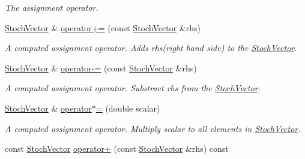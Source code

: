\begin{CompactItemize}
\begin{CompactList}\small\item\em The assignment operator. \item\end{CompactList}\item 
\hypertarget{class_stoch_vector_8a139128cf42525733cf6550758bd3c1}{
\hyperlink{class_stoch_vector}{StochVector} \& \hyperlink{class_stoch_vector_8a139128cf42525733cf6550758bd3c1}{operator+=} (const \hyperlink{class_stoch_vector}{StochVector} \&rhs)}
\label{class_stoch_vector_8a139128cf42525733cf6550758bd3c1}

\begin{CompactList}\small\item\em A computed assignment operator. Adds rhs(right hand side) to the \hyperlink{class_stoch_vector}{StochVector}. \item\end{CompactList}\item 
\hypertarget{class_stoch_vector_11c8e3838d66ac378f26b6d530f9ee65}{
\hyperlink{class_stoch_vector}{StochVector} \& \hyperlink{class_stoch_vector_11c8e3838d66ac378f26b6d530f9ee65}{operator-=} (const \hyperlink{class_stoch_vector}{StochVector} \&rhs)}
\label{class_stoch_vector_11c8e3838d66ac378f26b6d530f9ee65}

\begin{CompactList}\small\item\em A computed assignment operator. Substract rhs from the \hyperlink{class_stoch_vector}{StochVector}. \item\end{CompactList}\item 
\hypertarget{class_stoch_vector_16e677d36661f35ac230439e35223035}{
\hyperlink{class_stoch_vector}{StochVector} \& \hyperlink{class_stoch_vector_16e677d36661f35ac230439e35223035}{operator$\ast$=} (double scalar)}
\label{class_stoch_vector_16e677d36661f35ac230439e35223035}

\begin{CompactList}\small\item\em A computed assignment operator. Multiply scalar to all elements in \hyperlink{class_stoch_vector}{StochVector}. \item\end{CompactList}\item 
\hypertarget{class_stoch_vector_379fd3e9c84bca2a8df3447ab2179bcf}{
const \hyperlink{class_stoch_vector}{StochVector} \hyperlink{class_stoch_vector_379fd3e9c84bca2a8df3447ab2179bcf}{operator+} (const \hyperlink{class_stoch_vector}{StochVector} \&rhs) const }
\label{class_stoch_vector_379fd3e9c84bca2a8df3447ab2179bcf}


\end{CompactItemize}
